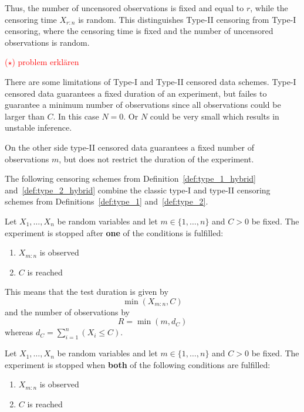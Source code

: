 Thus, the number of uncensored observations is fixed and equal to $r$, while the censoring time $X_{r:n}$ is random. This distinguishes Type-II censoring from Type-I censoring, where the censoring time is fixed and the number of uncensored observations is random.




\textcolor{red}{($\star$) problem erklären}

There are some limitations of Type-I and Type-II censored data schemes.
Type-I censored data guarantees a fixed duration of an experiment, but failes to guarantee a minimum number of observations since all observations could be larger than $C$. In this case $N = 0$. Or $N$ could be very small which results in unstable inference. 

On the other side type-II censored data guarantees a fixed number of observations $m$, but does not restrict the duration of the experiment.

The following censoring schemes from Definition~\ref{def:type_1_hybrid} and~\ref{def:type_2_hybrid} combine the classic type-I and type-II censoring schemes from Definitions~\ref{def:type_1} and~\ref{def:type_2}.

\begin{definition} \label{def:type_1_hybrid}
	Let $X_1, \ldots , X_n$ be random variables and let $m \in \{1, \dots, n\}$ and $C > 0$ be fixed.
	The experiment is stopped after \textbf{one} of the conditions is fulfilled:
	\begin{enumerate}
		\item $X_{m:n}$ is observed
		\item $C$ is reached
	\end{enumerate}
\end{definition} 

This means that the test duration is given by
\[
	\min \left( X_{m:n}, C \right)
\]
and the number of observations by
\[
	R = \min \left( m, d_C \right)
\]
whereas $d_C = \sum_{i=1}^n (X_i \leq C)$.

\begin{definition} \label{def:type_2_hybrid}
	Let $X_1, \ldots , X_n$ be random variables and let $m \in \{1, \dots, n\}$ and $C > 0$ be fixed.
	The experiment is stopped when \textbf{both} of the following conditions are fulfilled:
	\begin{enumerate}
		\item $X_{m:n}$ is observed
		\item $C$ is reached
	\end{enumerate}
\end{definition}


